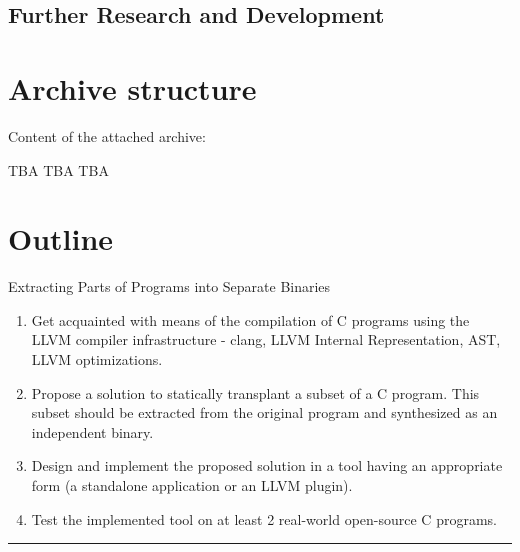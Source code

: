 \documentclass[12pt, twoside]{fithesis2}
\renewcommand{\_}{\leavevmode \kern0.07em\vbox{\hrule width0.4em}}
\newenvironment{myEnumerate}{
  \begin{enumerate}[
    leftmargin=2em,
    rightmargin=1em,
    itemsep=\parskip,
    parsep=0em,
    topsep=0em,
    partopsep=0em
]
}{
  \end{enumerate}
}
\begin{document}

\section{Further Research and Development}
\label{sec:conclusions-next}



\appendix

\printbibliography

\chapter{Archive structure}
\label{appendix:archive}

Content of the attached archive:

TBA TBA TBA

\chapter{Outline}

Extracting Parts of Programs into Separate Binaries

\begin{myEnumerate}
\item Get acquainted with means of the compilation of C programs using the LLVM
compiler infrastructure - clang, LLVM Internal Representation, AST, LLVM
optimizations.
\item Propose a solution to statically transplant a subset of a C program. This
subset should be extracted from the original program and synthesized as an
independent binary.
\item Design and implement the proposed solution in a tool having an
appropriate form (a standalone application or an LLVM plugin).
\item Test the implemented tool on at least 2 real-world open-source C
programs.
\end{myEnumerate}

\noindent\rule{\textwidth}{1pt}
\end{document}
